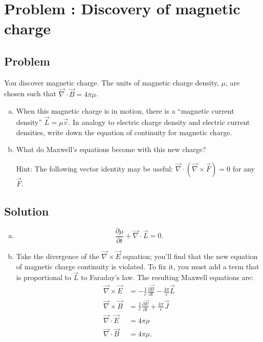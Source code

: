 \documentclass[solutions]{esg8022pset}
\date{\today }
\begin{document}
\section{Problem \thesection: Discovery of magnetic charge}
\subsection{Problem}
  You discover magnetic charge.  The units of magnetic charge density,
  $\mu$, are chosen such that $\vec\nabla\cdot\vec B = 4\pi\mu$.

  \begin{enumerate}[(a)]
    \item When this magnetic charge is in motion,
      there is a ``magnetic current density'' $\vec{L} = \mu \vec{v}$.  In
      analogy to electric charge density and electric current densities,
      write down the equation of continuity for magnetic charge.
    \item What do Maxwell's equations become with this
      new charge? \par\noindent
      Hint: The following vector identity may be useful: $\vec\nabla\cdot(\vec{\nabla}\times\vec{F}) = 0$ for any $\vec{F}$.
  \end{enumerate}
\subsection{Solution}
  \begin{enumerate}[(a)]
    \item
      \begin{equation}
        \frac{\partial \mu}{\partial t} + \vec{\nabla}\cdot\vec{L} = 0.
      \end{equation}
    \item Take the divergence of the $\vec\nabla\times\vec E$ equation; you'll
      find that the new equation of magnetic charge continuity is violated.
      To fix it, you must add a term that is proportional to $\vec L$ to
      Faraday's law.  The resulting Maxwell equations are:
      \begin{align}
        \vec{\nabla}\times\vec{E} &= -\frac{1}{c}\frac{\partial
          \vec{B}}{\partial t}-\frac{4\pi}{c}\vec{L}\\
        \vec{\nabla}\times\vec{B} &= \frac{1}{c}\frac{\partial
          \vec{E}}{\partial t}+\frac{4\pi}{c}\vec{J}\\
        \vec{\nabla}\cdot\vec{E}  &= 4\pi\rho\\
        \vec{\nabla}\cdot\vec{B}  &= 4\pi\mu.
      \end{align}
  \end{enumerate}
\end{document}
